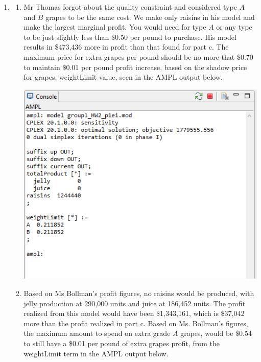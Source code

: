 \documentclass[11pt]{article}
\begin{document}
\begin{enumerate}
\begin{enumerate}
\begin{enumerate}
\end{enumerate}
\item 
\begin{enumerate}
\item Mr Thomas forgot about the quality constraint and considered type $A$ and $B$ grapes to be the same cost.  We make only raisins in his model and make the largest marginal profit.  You would need for type $A$ or any type to be just slightly less than \$0.50 per pound to purchase.  His model results in \$473,436 more in profit than that found for part c.  The maximum price for extra grapes per pound should be no more that \$0.70 to maintain \$0.01 per pound profit increase, based on the shadow price for grapes, weightLimit value, seen in the AMPL output below. 

\includegraphics[width=.9\textwidth]{output1ei.png}
\item Based on Ms Bollman's profit figures, no raisins would be produced, with jelly production at 290,000 units and juice at 186,452 units.  The profit realized from this model would have been \$1,343,161, which is \$37,042 more than the profit realized in part c.  Based on Ms. Bollman's figures, the maximum amount to spend on extra grade $A$ grapes, would be \$0.54 to still have a \$0.01 per pound of extra grapes profit, from the weightLimit term in the AMPL output below. 


\end{enumerate}
\end{enumerate}
\end{enumerate}
\end{document}
